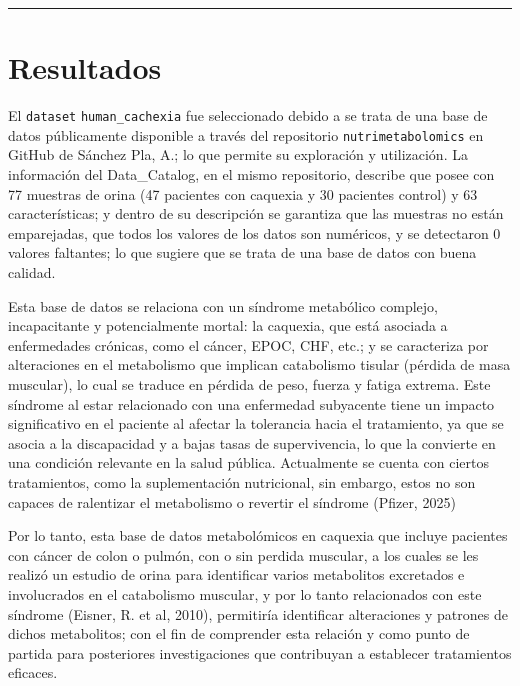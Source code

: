\documentclass[
]{article}
\begin{document}
\begin{center}\rule{0.5\linewidth}{0.5pt}\end{center}

\section{Resultados}\label{resultados}

El \texttt{dataset} \texttt{human\_cachexia} fue seleccionado debido a
se trata de una base de datos públicamente disponible a través del
repositorio \texttt{nutrimetabolomics} en GitHub de Sánchez Pla, A.; lo
que permite su exploración y utilización. La información del
Data\_Catalog, en el mismo repositorio, describe que posee con 77
muestras de orina (47 pacientes con caquexia y 30 pacientes control) y
63 características; y dentro de su descripción se garantiza que las
muestras no están emparejadas, que todos los valores de los datos son
numéricos, y se detectaron 0 valores faltantes; lo que sugiere que se
trata de una base de datos con buena calidad.

Esta base de datos se relaciona con un síndrome metabólico complejo,
incapacitante y potencialmente mortal: la caquexia, que está asociada a
enfermedades crónicas, como el cáncer, EPOC, CHF, etc.; y se caracteriza
por alteraciones en el metabolismo que implican catabolismo tisular
(pérdida de masa muscular), lo cual se traduce en pérdida de peso,
fuerza y fatiga extrema. Este síndrome al estar relacionado con una
enfermedad subyacente tiene un impacto significativo en el paciente al
afectar la tolerancia hacia el tratamiento, ya que se asocia a la
discapacidad y a bajas tasas de supervivencia, lo que la convierte en
una condición relevante en la salud pública. Actualmente se cuenta con
ciertos tratamientos, como la suplementación nutricional, sin embargo,
estos no son capaces de ralentizar el metabolismo o revertir el síndrome
(Pfizer, 2025)

Por lo tanto, esta base de datos metabolómicos en caquexia que incluye
pacientes con cáncer de colon o pulmón, con o sin perdida muscular, a
los cuales se les realizó un estudio de orina para identificar varios
metabolitos excretados e involucrados en el catabolismo muscular, y por
lo tanto relacionados con este síndrome (Eisner, R. et al, 2010),
permitiría identificar alteraciones y patrones de dichos metabolitos;
con el fin de comprender esta relación y como punto de partida para
posteriores investigaciones que contribuyan a establecer tratamientos
eficaces.
\end{document}

